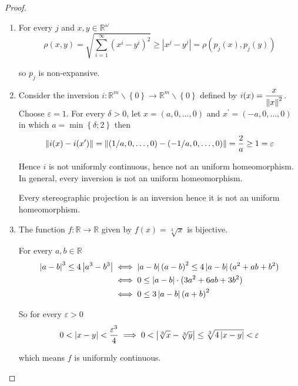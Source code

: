 \begin{proof}
	\begin{enumerate}[label={(\alph*)}]
		\item For every \( j \) and \( x, y \in \mathbb{R}^{\omega} \)
		      \[
			      \rho(x, y) = \sqrt{\sum_{i=1}^{\infty} {(x^{i} - y^{i})}^{2}} \ge \left\vert x^{j} - y^{j} \right\vert = \rho(p_{j}(x), p_{j}(y))
		      \]

		      so \( p_{j} \) is non-expansive.
		\item Consider the inversion \( i: \mathbb{R}^{m}\smallsetminus\left\{0\right\} \to \mathbb{R}^{m}\smallsetminus\left\{0\right\} \) defined by \( i(x) = \dfrac{x}{\left\Vert{x}\right\Vert^{2}} \). Choose \( \varepsilon = 1 \). For every \( \delta > 0 \), let \( x = \left( a, 0, \ldots, 0 \right) \) and \( x^{\prime} = \left( -a, 0, \ldots, 0 \right) \) in which \( a = \min\left\{ \delta; 2 \right\} \) then
		      \[
			      \left\Vert{ i(x) - i(x^{\prime}) }\right\Vert = \left\Vert{ (1/a, 0, \ldots, 0) - (-1/a, 0, \ldots, 0) }\right\Vert = \dfrac{2}{a} \ge 1 = \varepsilon
		      \]

		      Hence \( i \) is not uniformly continuous, hence not an uniform homeomorphism. In general, every inversion is not an uniform homeomorphism.

		      Every stereographic projection is an inversion hence it is not an uniform homeomorphism.
		\item The function \( f: \mathbb{R} \to \mathbb{R} \) given by \( f(x) = \sqrt[3]{x} \) is bijective.

		      For every \( a, b \in \mathbb{R} \)
		      \begingroup
		      \allowdisplaybreaks%
		      \begin{align*}
			      \left\vert{a - b}\right\vert^{3} \le 4\left\vert{a^{3} - b^{3}}\right\vert & \iff \left\vert{a - b}\right\vert{(a - b)}^{2} \le 4\left\vert{a - b}\right\vert{(a^{2} + ab + b^{2})} \\
			                                               & \iff 0 \le \left\vert{a - b}\right\vert\cdot (3a^{2} + 6ab + 3b^{2})                  \\
			                                               & \iff 0 \le 3\left\vert{a - b}\right\vert{(a + b)}^{2}
		      \end{align*}
		      \endgroup

		      So for every \( \varepsilon > 0 \)
		      \[
			      0 < \left\vert{x - y}\right\vert < \dfrac{\varepsilon^{3}}{4} \implies 0 < \left\vert{\sqrt[3]{x} - \sqrt[3]{y}}\right\vert \le \sqrt[3]{4\left\vert{x - y}\right\vert} < \varepsilon
		      \]

		      which means \( f \) is uniformly continuous.


\end{enumerate}
\end{proof}
